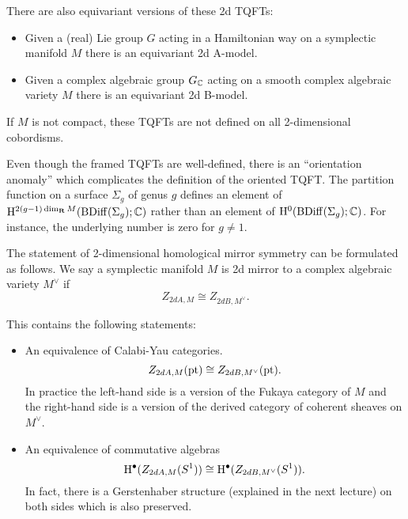There are also equivariant versions of these 2d TQFTs:
\begin{itemize}
	\item Given a (real) Lie group $G$ acting in a Hamiltonian way on a symplectic manifold $M$ there is an equivariant 2d A-model.
	\item Given a complex algebraic group $G_{\mathbb{C}}$ acting on a smooth complex algebraic variety $M$ there is an equivariant 2d B-model.
\end{itemize}

\begin{remark}
	If $M$ is not compact, these TQFTs are not defined on all 2-dimensional cobordisms.
\end{remark}

\begin{remark}
	Even though the framed TQFTs are well-defined, there is an ``orientation anomaly'' which complicates the definition of the oriented TQFT. The partition function on a surface $\Sigma_g$ of genus $g$ defines an element of $\mathrm{H}^{2(g-1)\dim_{\mathbf{R}} M}(\mathrm{B}\mathrm{Diff}(\Sigma_g); \mathbb{C})$ rather than an element of $\mathrm{H}^0(\mathrm{B}\mathrm{Diff}(\Sigma_g); \mathbb{C})$. For instance, the underlying number is zero for $g\neq 1$.
\end{remark}

The statement of 2-dimensional homological mirror symmetry can be formulated as follows. We say a symplectic manifold $M$ is 2d mirror to a complex algebraic variety $M^\vee$ if
\[Z_{2dA, M}\cong Z_{2dB, M^\vee}.\]

This contains the following statements:
\begin{itemize}
	\item An equivalence of Calabi-Yau categories.
	\[Z_{2dA, M}(\mathrm{pt})\cong Z_{2dB, M^\vee}(\mathrm{pt}).\]
	In practice the left-hand side is a version of the Fukaya category of $M$ and the right-hand side is a version of the derived category of coherent sheaves on $M^\vee$.
	\item An equivalence of commutative algebras
	\[\mathrm{H}^\bullet(Z_{2dA, M}(S^1))\cong \mathrm{H}^\bullet(Z_{2dB, M^\vee}(S^1)).\]
	In fact, there is a Gerstenhaber structure (explained in the next lecture) on both sides which is also preserved.
\end{itemize}